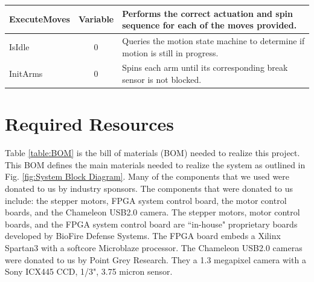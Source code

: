 \documentclass[final, letterpaper, 10 pt, conference, twocolumn]{IEEEtran}
\begin{document}
\begin{table}[!ht]
{\begin{tabular}{|l|c|l|}
ExecuteMoves     & Variable & Performs the correct actuation and spin sequence for each of the moves provided.                    \\ \hline  
                                                                                      
IsIdle                    & 0           &  Queries the motion state machine to determine if motion is still in progress.                   \\ \hline
                                                 
InitArms               & 0           & Spins each arm until its corresponding break sensor is not blocked.                    \\ \hline                                                                           
\end{tabular}}
\end{table}

\section{Required Resources}
Table \ref{table:BOM} is the bill of materials (BOM) needed to realize this project. This BOM defines the main materials needed to realize the system as outlined in Fig. \ref{fig:System Block Diagram}.
Many of the components that we used were donated to us by industry sponsors. The components that were donated to us include: the stepper motors, FPGA system control board, the
motor control boards, and the Chameleon USB2.0 camera. The stepper motors, motor control boards, and the FPGA system control board are ``in-house" proprietary boards developed by BioFire Defense Systems.
The FPGA board embeds a Xilinx Spartan3 with a softcore Microblaze processor. The Chameleon USB2.0 cameras were donated to us by Point Grey Research. They a 1.3 megapixel camera with a Sony ICX445 CCD, 1/3", 3.75 micron sensor.
\end{document}
